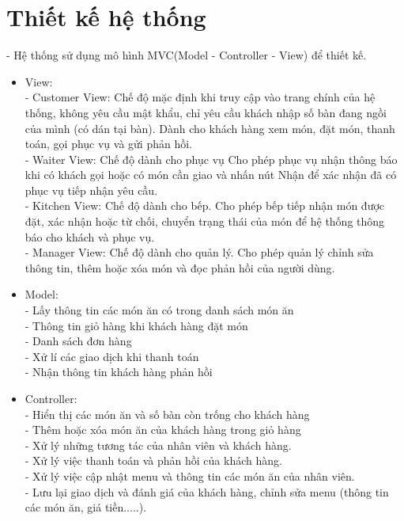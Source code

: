 \newpage
\section{Thiết kế hệ thống}
- Hệ thống sử dụng mô hình MVC(Model - Controller - View) để thiết kế.
\begin{itemize}
    \item View: \\
    - Customer View: Chế độ mặc định khi truy cập vào trang chính của hệ thống, không yêu cầu mật khẩu, chỉ yêu cầu khách nhập số bàn đang ngồi của mình (có dán tại bàn). Dành cho khách hàng xem món, đặt món, thanh toán, gọi phục vụ và gửi phản hồi.\\
    - Waiter View: Chế độ dành cho phục vụ Cho phép phục vụ nhận thông báo khi có khách gọi hoặc có món cần giao và nhấn nút Nhận để xác nhận đã có phục vụ tiếp nhận yêu cầu.\\
    - Kitchen View: Chế độ dành cho bếp. Cho phép bếp tiếp nhận món được đặt, xác nhận hoặc từ chối, chuyển trạng thái của món để hệ thống thông báo cho khách và phục vụ.\\
    - Manager View: Chế độ dành cho quản lý. Cho phép quản lý chỉnh sửa thông tin, thêm hoặc xóa món và đọc phản hồi của người dùng.
    \item Model:\\
    - Lấy thông tin các món ăn có trong danh sách món ăn\\
    - Thông tin giỏ hàng khi khách hàng đặt món\\
    - Danh sách đơn hàng\\
    - Xử lí các giao dịch khi thanh toán\\
    - Nhận thông tin khách hàng phản hồi
    \item Controller:\\
    - Hiển thị các món ăn và số bàn còn trống cho khách hàng\\
    - Thêm hoặc xóa món ăn của khách hàng trong giỏ hàng\\
    - Xử lý những tương tác của nhân viên và khách hàng.\\
    - Xử lý việc thanh toán và phản hồi của khách hàng.\\
    - Xử lý việc cập nhật menu và thông tin các món ăn của nhân viên.\\
    - Lưu lại giao dịch và đánh giá của khách hàng, chỉnh sửa menu (thông tin các món ăn, giá tiền.....).
\end{itemize}
